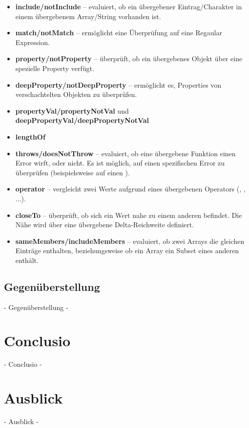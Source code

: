 \begin{itemize}
  \item \textbf{include/notInclude} -- evaluiert, ob ein übergebener Eintrag/Charakter in einem übergebenem Array/String vorhanden ist.
  
  \item \textbf{match/notMatch} -- ermöglicht eine Überprüfung auf eine Regaular Expression.
  
  \item \textbf{property/notProperty} -- überprüft, ob ein übergebenes Objekt über eine spezielle Property verfügt.
  
  \item \textbf{deepProperty/notDeepProperty} -- ermöglicht es, Properties von verschachtelten Objekten zu überprüfen.
  
  \item \textbf{propertyVal/propertyNotVal} und \textbf{deepPropertyVal/deepPropertyNotVal}
  
  \item \textbf{lengthOf}
  
  \item \textbf{throws/doesNotThrow} -- evaluiert, ob eine übergebene Funktion einen Error wirft, oder nicht. Es ist möglich, auf einen spezifischen Error zu überprüfen (beispielsweise auf einen ).
  
  \item \textbf{operator} -- vergleicht zwei Werte aufgrund eines übergebenen Operators (\glqq{<\grqq}, \glqq{>\grqq}, ...).
  
  \item \textbf{closeTo} -- überprüft, ob sich ein Wert nahe zu einem anderen befindet. Die Nähe wird über eine übergebene Delta-Reichweite definiert.
  
  \item \textbf{sameMembers/includeMembers} -- evaluiert, ob zwei Arrays die gleichen Einträge enthalten, beziehungsweise ob ein Array ein Subset eines anderen enthält.
  
\end{itemize}

\newpage
\subsection{Gegenüberstellung}
 - Gegenüberstellung -
\newpage
\section{Conclusio}
 - Conclusio -

\newpage
\section{Ausblick}
 - Ausblick -

\nocite{Green:2013}
\nocite{Kozlowski:2013}
\nocite{Zakas:2012}
\nocite{MacCaw:2011}
\nocite{Burnham:2011}
\nocite{Gaertner:2012}
